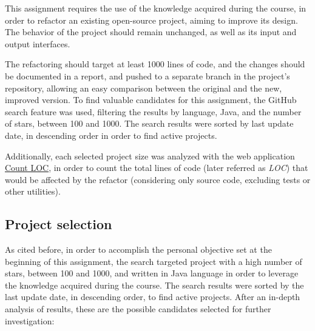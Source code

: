 This assignment requires the use of the knowledge acquired during the course, in order to refactor an existing open-source project, aiming to improve its design. The behavior of the project should remain unchanged, as well as its input and output interfaces.

The refactoring should target at least 1000 lines of code, and the changes should be documented in a report, and pushed to a separate branch in the project's repository, allowing an easy comparison between the original and the new, improved version. To find valuable candidates for this assignment, the GitHub search feature was used, filtering the results by language, Java, and the number of stars, between 100 and 1000. The search results were sorted by last update date, in descending order in order to find active projects.

Additionally, each selected project size was analyzed with the web application \href{https://codetabs.com/count-loc/count-loc-online.html}{Count LOC}, in order to count the total lines of code (later referred as \emph{LOC}) that would be affected by the refactor (considering only source code, excluding tests or other utilities).

\subsection{Project selection}

As cited before, in order to accomplish the personal objective set at the beginning of this assignment, the search targeted project with a high number of stars, between 100 and 1000, and written in Java language in order to leverage the knowledge acquired during the course. The search results were sorted by the last update date, in descending order, to find active projects. After an in-depth analysis of results, these are the possible candidates selected for further investigation:

